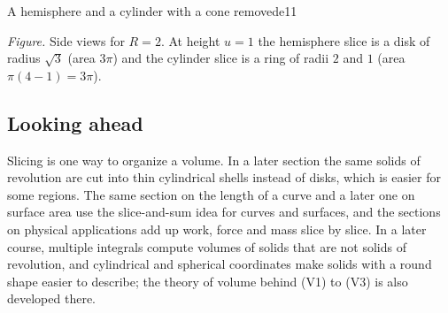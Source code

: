 \documentclass[11pt]{article}
\begin{document}
\begin{exmp}{A hemisphere and a cylinder with a cone removed}{e11}
\begin{center}
\par\small\emph{Figure.} Side views for $R=2$. At height $u=1$ the hemisphere slice is a disk of radius $\sqrt3$ (area $3\pi$) and the cylinder slice is a ring of radii $2$ and $1$ (area $\pi(4-1)=3\pi$).
\end{center}
\end{exmp}

\subsection*{Looking ahead}

Slicing is one way to organize a volume. In a later section the same solids of revolution are cut into thin cylindrical shells instead of disks, which is easier for some regions. The same section on the length of a curve and a later one on surface area use the slice-and-sum idea for curves and surfaces, and the sections on physical applications add up work, force and mass slice by slice. In a later course, multiple integrals compute volumes of solids that are not solids of revolution, and cylindrical and spherical coordinates make solids with a round shape easier to describe; the theory of volume behind (V1) to (V3) is also developed there.
\end{document}

